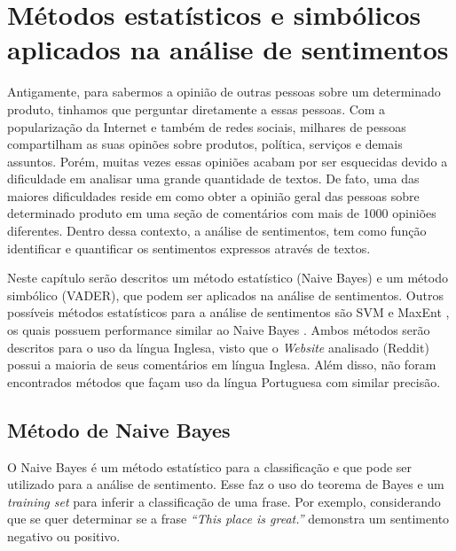 \chapter{Métodos estatísticos e simbólicos aplicados na análise de sentimentos}
\label{cap:Classificadores}

Antigamente, para sabermos a opinião de outras pessoas sobre um
determinado produto, tinhamos que perguntar diretamente a essas pessoas. Com a
popularização da Internet e também de redes sociais, milhares de pessoas
compartilham as suas opinões sobre produtos, política, serviços e
demais assuntos. Porém, muitas vezes essas opiniões acabam
por ser esquecidas devido a dificuldade em analisar uma grande quantidade de
textos. De fato, uma das maiores dificuldades reside em como obter a opinião
geral das pessoas sobre determinado produto em uma seção de comentários com mais
de 1000 opiniões diferentes. Dentro dessa contexto, a análise de sentimentos,
tem como função identificar e quantificar os sentimentos expressos através de
textos.

Neste capítulo serão descritos um método estatístico (Naive Bayes) e um método
simbólico (\ac{VADER}), que podem ser aplicados na análise de sentimentos.
Outros possíveis métodos estatísticos para a análise de sentimentos são \ac{SVM}
\cite{Hearst:1998:SVM:630302.630387} e \ac{MaxEnt}
\cite{Berger:1996:MEA:234285.234289}, os quais possuem performance similar ao Naive Bayes \cite{Pang:2002:TUS:1118693.1118704}. Ambos métodos serão descritos para o uso da língua Inglesa, visto que o \textit{Website} analisado (Reddit) possui a maioria de seus
comentários em língua Inglesa. Além disso, não foram encontrados métodos que
façam uso da língua Portuguesa com similar precisão.





\section{Método de Naive Bayes}

O Naive Bayes é um método estatístico para a classificação e que pode ser
utilizado para a análise de sentimento. Esse faz o uso do teorema de Bayes e um
\textit{training set} para inferir a classificação de uma frase. Por exemplo,
considerando que se quer determinar se a frase \textit{``This place is
great.''} demonstra um sentimento negativo ou positivo.

